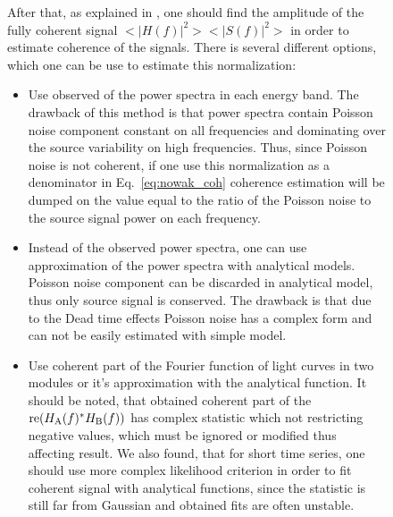 \begin{figure}
After that, as explained in \citep{Nowak99}, one should find the amplitude of the fully coherent signal $<|H(f)|^2><|S(f)|^2>$ in order to estimate coherence of the signals. 
There is several different options, which one can be use to estimate this normalization:
\begin{itemize}
        \item Use observed of the power spectra in each energy band. 
                The drawback of this method is that power spectra contain Poisson noise component constant on all frequencies and dominating over the source variability on high frequencies. 
                Thus, since Poisson noise is not coherent,  if one use this normalization as a denominator in Eq.~\ref{eq:nowak_coh} coherence estimation will be dumped on the value equal to the ratio of the Poisson noise to the source signal power on each frequency.
        \item Instead of the observed power spectra, one can use approximation of the power spectra with analytical models. 
                Poisson noise component can be discarded in analytical model, thus only source signal is conserved. 
                The drawback is that due to the Dead time effects Poisson noise has a complex form and can not be easily estimated with simple model.
        \item Use coherent part of the Fourier function of light curves in two modules \citep{2015ApJ...800..109B} or it's approximation with the analytical function. 
                It should be noted, that obtained coherent part of the ${\rm re}(H_{\rm A}(f)^*H_{\rm B}(f))$ has complex statistic which not restricting negative values, which must be ignored or modified thus affecting result.  
                We also found, that for short time series, one should use more complex likelihood criterion in order to fit coherent signal with analytical functions, since the statistic is still far from Gaussian and obtained fits are often unstable.
\end{itemize}


\end{figure}

